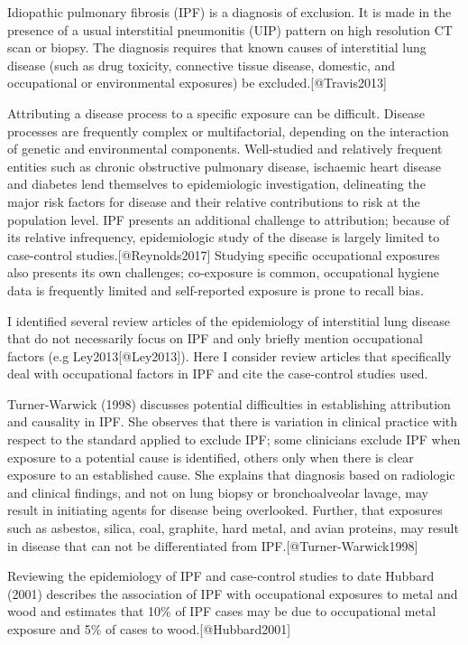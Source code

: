 \documentclass[
]{article}
\begin{document}
Idiopathic pulmonary fibrosis (IPF) is a diagnosis of exclusion. It is
made in the presence of a usual interstitial pneumonitis (UIP) pattern
on high resolution CT scan or biopsy. The diagnosis requires that known
causes of interstitial lung disease (such as drug toxicity, connective
tissue disease, domestic, and occupational or environmental exposures)
be excluded.{[}@Travis2013{]}

Attributing a disease process to a specific exposure can be difficult.
Disease processes are frequently complex or multifactorial, depending on
the interaction of genetic and environmental components. Well-studied
and relatively frequent entities such as chronic obstructive pulmonary
disease, ischaemic heart disease and diabetes lend themselves to
epidemiologic investigation, delineating the major risk factors for
disease and their relative contributions to risk at the population
level. IPF presents an additional challenge to attribution; because of
its relative infrequency, epidemiologic study of the disease is largely
limited to case-control studies.{[}@Reynolds2017{]} Studying specific
occupational exposures also presents its own challenges; co-exposure is
common, occupational hygiene data is frequently limited and
self-reported exposure is prone to recall bias.

I identified several review articles of the epidemiology of interstitial
lung disease that do not necessarily focus on IPF and only briefly
mention occupational factors (e.g Ley2013{[}@Ley2013{]}). Here I
consider review articles that specifically deal with occupational
factors in IPF and cite the case-control studies used.

Turner-Warwick (1998) discusses potential difficulties in establishing
attribution and causality in IPF. She observes that there is variation
in clinical practice with respect to the standard applied to exclude
IPF; some clinicians exclude IPF when exposure to a potential cause is
identified, others only when there is clear exposure to an established
cause. She explains that diagnosis based on radiologic and clinical
findings, and not on lung biopsy or bronchoalveolar lavage, may result
in initiating agents for disease being overlooked. Further, that
exposures such as asbestos, silica, coal, graphite, hard metal, and
avian proteins, may result in disease that can not be differentiated
from IPF.{[}@Turner-Warwick1998{]}

Reviewing the epidemiology of IPF and case-control studies to date
Hubbard (2001) describes the association of IPF with occupational
exposures to metal and wood and estimates that 10\% of IPF cases may be
due to occupational metal exposure and 5\% of cases to
wood.{[}@Hubbard2001{]}
\end{document}

